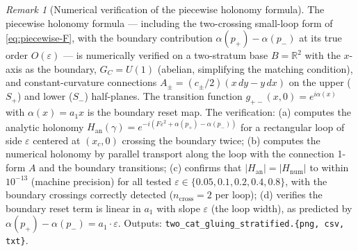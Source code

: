 \documentclass[11pt,a4paper]{article}
\theoremstyle{plain}
\theoremstyle{definition}
\theoremstyle{remark}
\newtheorem{remark}[theorem]{Remark}
\newcommand{\RR}{\mathbb{R}}
\begin{document}
\begin{remark}[Numerical verification of the piecewise holonomy formula]
\label{rem:2cat-gluing-numeric}
The piecewise holonomy formula --- including the two-crossing
small-loop form of \eqref{eq:piecewise-F}, with the boundary
contribution $\alpha(p_+) - \alpha(p_-)$ at its true order
$O(\varepsilon)$ --- is numerically verified on a two-stratum base
$B = \RR^2$ with the $x$-axis as the boundary, $G_C = U(1)$ (abelian,
simplifying the matching condition), and constant-curvature connections
$A_\pm = (c_\pm/2)(x\,dy - y\,dx)$ on the upper ($S_+$) and lower
($S_-$) half-planes. The transition function $g_{+-}(x, 0) = e^{i \alpha(x)}$
with $\alpha(x) = a_1 x$ is the boundary reset map. The verification:
(a) computes the analytic holonomy $H_{\mathrm{an}}(\gamma) =
e^{-i(F \varepsilon^2 + \alpha(p_+) - \alpha(p_-))}$ for a rectangular
loop of side $\varepsilon$ centered at $(x_c, 0)$ crossing the boundary
twice; (b) computes the numerical holonomy by parallel transport along
the loop with the connection 1-form $A$ and the boundary transitions;
(c) confirms that $|H_{\mathrm{an}}| = |H_{\mathrm{num}}|$ to within
$10^{-13}$ (machine precision) for all tested $\varepsilon \in \{0.05,
0.1, 0.2, 0.4, 0.8\}$, with the boundary crossings correctly detected
($n_{\mathrm{cross}} = 2$ per loop); (d) verifies the boundary reset
term is linear in $a_1$ with slope $\varepsilon$ (the loop width), as
predicted by $\alpha(p_+) - \alpha(p_-) = a_1 \cdot \varepsilon$. Outputs:
\texttt{two\_cat\_gluing\_stratified.\{png, csv, txt\}}.
\end{remark}
\end{document}
